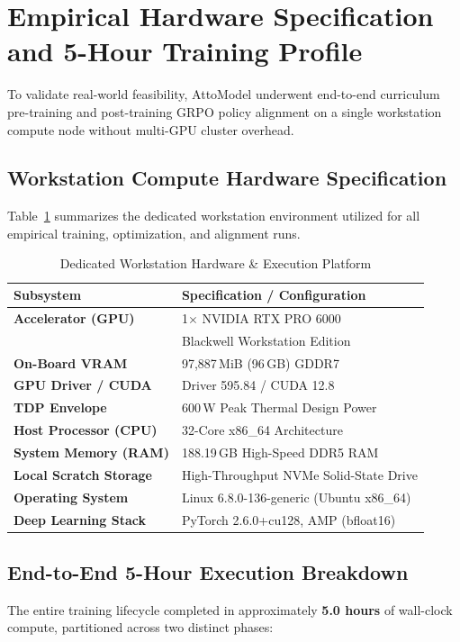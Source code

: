 \documentclass[10pt,twocolumn,letterpaper]{article}
\begin{document}
\section{Empirical Hardware Specification and 5-Hour Training Profile}

To validate real-world feasibility, AttoModel underwent end-to-end curriculum pre-training and post-training GRPO policy alignment on a single workstation compute node without multi-GPU cluster overhead.

\subsection{Workstation Compute Hardware Specification}
Table~\ref{tab:hardware_specs} summarizes the dedicated workstation environment utilized for all empirical training, optimization, and alignment runs.

\begin{table}[h]
\centering
\small
\caption{Dedicated Workstation Hardware \& Execution Platform}
\label{tab:hardware_specs}
\begin{tabular}{@{}ll@{}}
\toprule
\textbf{Subsystem} & \textbf{Specification / Configuration} \\
\midrule
\textbf{Accelerator (GPU)} & 1$\times$ NVIDIA RTX PRO 6000 \\
& Blackwell Workstation Edition \\
\textbf{On-Board VRAM} & 97,887\,MiB (96\,GB) GDDR7 \\
\textbf{GPU Driver / CUDA} & Driver 595.84 / CUDA 12.8 \\
\textbf{TDP Envelope} & 600\,W Peak Thermal Design Power \\
\textbf{Host Processor (CPU)} & 32-Core x86\_64 Architecture \\
\textbf{System Memory (RAM)} & 188.19\,GB High-Speed DDR5 RAM \\
\textbf{Local Scratch Storage} & High-Throughput NVMe Solid-State Drive \\
\textbf{Operating System} & Linux 6.8.0-136-generic (Ubuntu x86\_64) \\
\textbf{Deep Learning Stack} & PyTorch 2.6.0+cu128, AMP (bfloat16) \\
\bottomrule
\end{tabular}
\end{table}

\subsection{End-to-End 5-Hour Execution Breakdown}
The entire training lifecycle completed in approximately \textbf{5.0 hours} of wall-clock compute, partitioned across two distinct phases:
\end{document}
